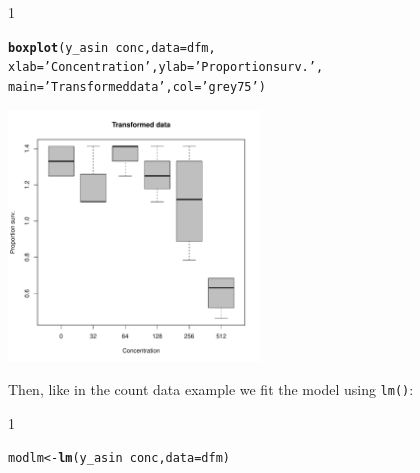 \documentclass{scrartcl}\usepackage[]{graphicx}\usepackage[]{color}
\makeatletter
\newcommand{\hlstr}[1]{\textcolor[rgb]{0.192,0.494,0.8}{#1}}%
\newcommand{\hlopt}[1]{\textcolor[rgb]{0,0,0}{#1}}%
\newcommand{\hlstd}[1]{\textcolor[rgb]{0.345,0.345,0.345}{#1}}%
\newcommand{\hlkwb}[1]{\textcolor[rgb]{0.69,0.353,0.396}{#1}}%
\newcommand{\hlkwc}[1]{\textcolor[rgb]{0.333,0.667,0.333}{#1}}%
\newcommand{\hlkwd}[1]{\textcolor[rgb]{0.737,0.353,0.396}{\textbf{#1}}}%
\newenvironment{kframe}{%
 \def\at@end@of@kframe{}%
 \ifinner\ifhmode%
  \def\at@end@of@kframe{\end{minipage}}%
  \begin{minipage}{\columnwidth}%
 \fi\fi%
 \def\FrameCommand##1{\hskip\@totalleftmargin \hskip-\fboxsep
 \colorbox{shadecolor}{##1}\hskip-\fboxsep
     \hskip-\linewidth \hskip-\@totalleftmargin \hskip\columnwidth}%
 \MakeFramed {\advance\hsize-\width
   \@totalleftmargin\z@ \linewidth\hsize
   \@setminipage}}%
 {\par\unskip\endMakeFramed%
 \at@end@of@kframe}
\newenvironment{knitrout}{}{} %
\renewenvironment{knitrout}{\begin{spacing}{1}}{\end{spacing}}
\makeatother
\begin{document}
\begin{knitrout}
\color{fgcolor}\begin{kframe}
\begin{alltt}
\hlkwd{boxplot}\hlstd{(y_asin} \hlopt{~} \hlstd{conc,} \hlkwc{data} \hlstd{= dfm,}
        \hlkwc{xlab} \hlstd{=} \hlstr{'Concentration'}\hlstd{,} \hlkwc{ylab} \hlstd{=} \hlstr{'Proportion surv.'}\hlstd{,}
        \hlkwc{main} \hlstd{=} \hlstr{'Transformed data'}\hlstd{,} \hlkwc{col} \hlstd{=} \hlstr{'grey75'}\hlstd{)}
\end{alltt}
\end{kframe}

{\centering \includegraphics[width=0.5\textwidth]{figure/bin_trans_plot-1} 

}



\end{knitrout}


Then, like in the count data example we fit the model using \texttt{lm()}:
\begin{knitrout}
\color{fgcolor}\begin{kframe}
\begin{alltt}
\hlstd{modlm} \hlkwb{<-} \hlkwd{lm}\hlstd{(y_asin} \hlopt{~} \hlstd{conc,} \hlkwc{data} \hlstd{= dfm)}
\end{alltt}
\end{kframe}
\end{knitrout}
\end{document}
